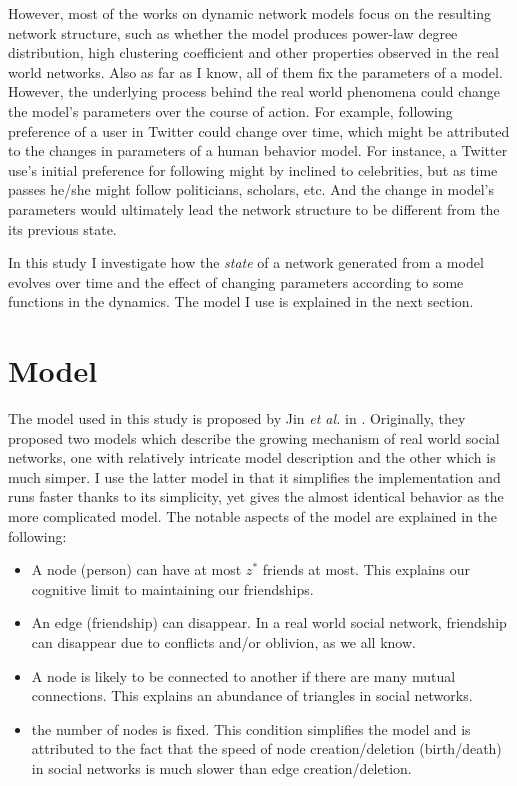 \documentclass{article}
\begin{document}
However, most of the works on dynamic network models focus on the resulting network structure, such as whether the model produces power-law degree distribution, high clustering coefficient and other properties observed in the real world networks. Also as far as I know, all of them fix the parameters of a model. However, the underlying process behind the real world phenomena could change the model's parameters over the course of action. For example, following preference of a user in Twitter could change over time, which might be attributed to the changes in parameters of a human behavior model. For instance, a Twitter use's initial preference for following might by inclined to celebrities, but as time passes he/she might follow politicians, scholars, etc. And the change in model's parameters would ultimately lead the network structure to be different from the its previous state.

In this study I investigate how the \textit{state} of a network  generated from a model evolves over time and the effect of changing parameters according to some functions in the dynamics. The model I use is explained in the next section.

\section{Model}
The model used in this study is proposed by Jin \textit{et al.} in \cite{PhysRevE.64.046132}. Originally, they proposed two models which describe the growing mechanism of real world social networks, one with relatively intricate model description and the other which is much simper. I use the latter model in that it simplifies the implementation and runs faster thanks to its simplicity, yet gives the almost identical behavior as the more complicated model. The notable aspects of the model are explained in the following:
\begin{itemize}
\item A node (person) can have at most $z^*$ friends at most. This explains our cognitive limit to maintaining our friendships.
\item An edge (friendship) can disappear. In a real world social network, friendship can disappear due to conflicts and/or oblivion, as we all know.
\item A node is likely to be connected to another if there are many mutual connections. This explains an abundance of triangles in social networks.
\item the number of nodes is fixed. This condition simplifies the model and is attributed to the fact that the speed of node creation/deletion (birth/death) in social networks is much slower than edge creation/deletion.
\end{itemize}
\end{document}
